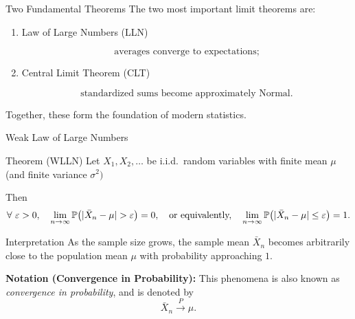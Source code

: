 \begin{frame}{Two Fundamental Theorems}
The two most important limit theorems are:

\vspace{0.25cm}

\begin{enumerate}
    \item Law of Large Numbers (LLN)

    \[
    \text{averages converge to expectations;}
    \]

    \item Central Limit Theorem (CLT)

    \[
    \text{standardized sums become approximately Normal.}
    \]
\end{enumerate}

\vspace{0.25cm}

Together, these form the foundation of modern statistics.
\end{frame}



\begin{frame}{Weak Law of Large Numbers}

\begin{keybox}{Theorem (WLLN)}
Let $X_1,X_2,\dots$ be i.i.d.\ random variables with finite mean $\mu$ (and finite variance $\sigma^2)$


Then
\[
\forall  \ \varepsilon>0, \quad  \lim_{n\to\infty}
\Prob\!\left(
|\bar X_n-\mu|>\varepsilon
\right)
=0, \quad 
\text{or equivalently,} 
\quad   \lim_{n\to\infty}
\Prob\!\left(
|\bar X_n-\mu|\le \varepsilon
\right)
=1.
\]
 
\end{keybox}



\begin{keybox}{Interpretation}
As the sample size grows, the sample mean $\bar X_n$
becomes arbitrarily close to the population mean $\mu$
with probability approaching \(1\).
\end{keybox}

\textbf{Notation (Convergence in Probability):} This phenomena is also known as \textit{convergence in probability}, and is denoted by
\begin{equation*}
    \bar X_n \xrightarrow[]{P}\mu.
\end{equation*}

\end{frame}







